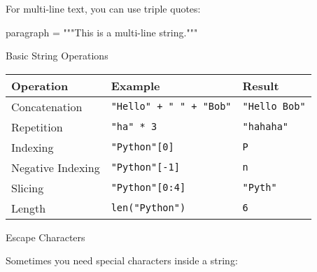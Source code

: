 \documentclass[
  letterpaper,
  DIV=11,
  numbers=noendperiod]{scrreprt}
\newenvironment{Shaded}{\begin{snugshade}}{\end{snugshade}}
\newcommand{\NormalTok}[1]{\textcolor[rgb]{0.00,0.23,0.31}{#1}}
\newcommand{\OperatorTok}[1]{\textcolor[rgb]{0.37,0.37,0.37}{#1}}
\newcommand{\StringTok}[1]{\textcolor[rgb]{0.13,0.47,0.30}{#1}}
\begin{document}
For multi-line text, you can use triple quotes:

\begin{Shaded}
\begin{Highlighting}[]
\NormalTok{paragraph }\OperatorTok{=} \StringTok{"""This is a }
\StringTok{multi{-}line string."""}
\end{Highlighting}
\end{Shaded}

Basic String Operations

\begin{longtable}[]{@{}lll@{}}
\toprule\noalign{}
Operation & Example & Result \\
\midrule\noalign{}
\endhead
\bottomrule\noalign{}
\endlastfoot
Concatenation & \texttt{"Hello"\ +\ "\ "\ +\ "Bob"} &
\texttt{"Hello\ Bob"} \\
Repetition & \texttt{"ha"\ *\ 3} & \texttt{"hahaha"} \\
Indexing & \texttt{"Python"{[}0{]}} &
\texttt{\textquotesingle{}P\textquotesingle{}} \\
Negative Indexing & \texttt{"Python"{[}-1{]}} &
\texttt{\textquotesingle{}n\textquotesingle{}} \\
Slicing & \texttt{"Python"{[}0:4{]}} & \texttt{"Pyth"} \\
Length & \texttt{len("Python")} & \texttt{6} \\
\end{longtable}

Escape Characters

Sometimes you need special characters inside a string:
\end{document}
